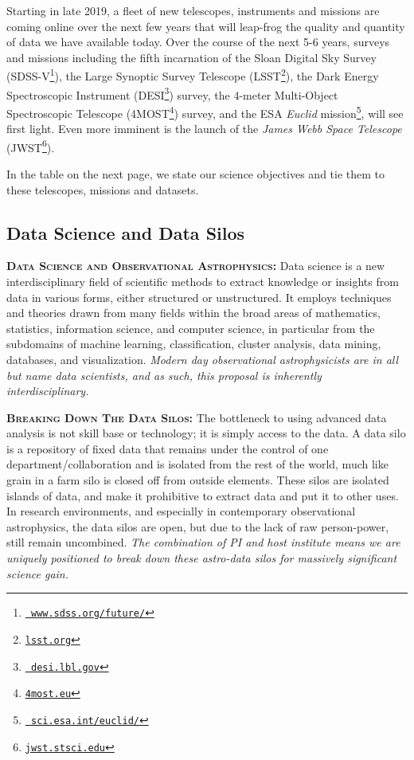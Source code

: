 \smallskip
\smallskip
\noindent
Starting in late 2019, a fleet of new telescopes, instruments and
missions are coming online over the next few years that will leap-frog
the quality and quantity of data we have available today. Over the
course of the next 5-6 years, surveys and missions including the fifth
incarnation of the Sloan Digital Sky Survey
(SDSS-V\footnote{\href{www.sdss.org/future/}{{\tt
www.sdss.org/future/}}}), the Large Synoptic Survey Telescope
(LSST\footnote{\href{lsst.org}{{\tt lsst.org}}}), the Dark Energy
Spectroscopic Instrument (DESI\footnote{\href{desi.lbl.gov}{{\tt
desi.lbl.gov}}}) survey, the 4-meter Multi-Object Spectroscopic
Telescope (4MOST\footnote{\href{4most.eu}{{\tt 4most.eu}}}) survey,
and the ESA {\it Euclid}
mission\footnote{\href{sci.esa.int/euclid/}{{\tt
sci.esa.int/euclid/}}}, will see first light. Even more imminent is
the launch of the {\it James Webb Space Telescope}
(JWST\footnote{\href{jwst.stsci.edu}{{\tt jwst.stsci.edu}}}).





\smallskip
\smallskip
\noindent
In the table on the next page, we state our science objectives and tie them to these 
telescopes, missions and datasets. 


\subsection{Data Science and Data Silos}
\noindent
\textbf{\textsc{{Data Science and Observational Astrophysics: }}}
Data science is a new interdisciplinary field of scientific methods to
extract knowledge or insights from data in various forms, either
structured or unstructured. It employs techniques and theories drawn
from many fields within the broad areas of mathematics, statistics,
information science, and computer science, in particular from the
subdomains of machine learning, classification, cluster analysis, data
mining, databases, and visualization.  {\it Modern day observational
astrophysicists are in all but name data scientists, and as such, this
proposal is inherently interdisciplinary.}

\smallskip
\smallskip
\noindent
\textbf{\textsc{Breaking Down The Data Silos: }}
The bottleneck to using advanced data analysis is not skill base or
technology; it is simply access to the data.  A data silo is a
repository of fixed data that remains under the control of one
department/collaboration and is isolated from the rest of the world,
much like grain in a farm silo is closed off from outside
elements. These silos are isolated islands of data, and make it
prohibitive to extract data and put it to other uses. In research
environments, and especially in contemporary observational
astrophysics, the data silos are open, but due to the lack of raw
person-power, still remain uncombined. {\it The combination of
PI and host institute means we are uniquely positioned to break down
these astro-data silos for massively significant science gain.}

